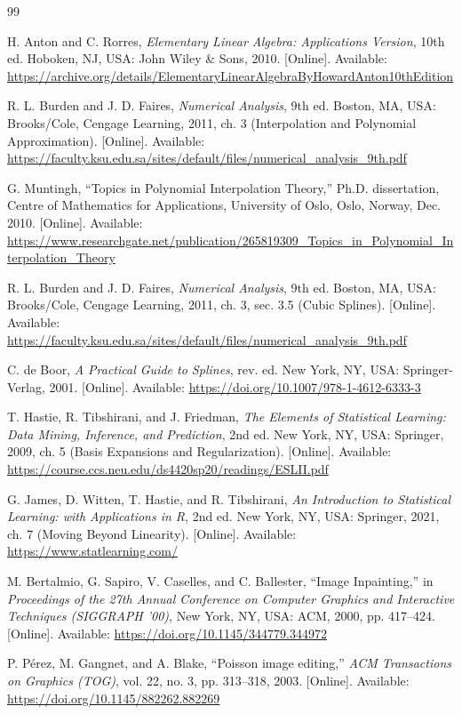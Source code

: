 \documentclass[12pt,a4paper]{report}
\begin{document}
\begin{thebibliography}{99} 
\setlength{\itemsep}{0.5em}

H. Anton and C. Rorres, \textit{Elementary Linear Algebra: Applications Version}, 10th ed. Hoboken, NJ, USA: John Wiley \& Sons, 2010. [Online]. Available: \url{https://archive.org/details/ElementaryLinearAlgebraByHowardAnton10thEdition}

R. L. Burden and J. D. Faires, \textit{Numerical Analysis}, 9th ed. Boston, MA, USA: Brooks/Cole, Cengage Learning, 2011, ch. 3 (Interpolation and Polynomial Approximation). [Online]. Available: \url{https://faculty.ksu.edu.sa/sites/default/files/numerical_analysis_9th.pdf}

G. Muntingh, ``Topics in Polynomial Interpolation Theory,'' Ph.D. dissertation, Centre of Mathematics for Applications, University of Oslo, Oslo, Norway, Dec. 2010. [Online]. Available: \url{https://www.researchgate.net/publication/265819309_Topics_in_Polynomial_Interpolation_Theory}

R. L. Burden and J. D. Faires, \textit{Numerical Analysis}, 9th ed. Boston, MA, USA: Brooks/Cole, Cengage Learning, 2011, ch. 3, sec. 3.5 (Cubic Splines). [Online]. Available: \url{https://faculty.ksu.edu.sa/sites/default/files/numerical_analysis_9th.pdf}

C. de Boor, \textit{A Practical Guide to Splines}, rev. ed. New York, NY, USA: Springer-Verlag, 2001. [Online]. Available: \url{https://doi.org/10.1007/978-1-4612-6333-3}

T. Hastie, R. Tibshirani, and J. Friedman, \textit{The Elements of Statistical Learning: Data Mining, Inference, and Prediction}, 2nd ed. New York, NY, USA: Springer, 2009, ch. 5 (Basis Expansions and Regularization). [Online]. Available: \url{https://course.ccs.neu.edu/ds4420sp20/readings/ESLII.pdf}

G. James, D. Witten, T. Hastie, and R. Tibshirani, \textit{An Introduction to Statistical Learning: with Applications in R}, 2nd ed. New York, NY, USA: Springer, 2021, ch. 7 (Moving Beyond Linearity). [Online]. Available: \url{https://www.statlearning.com/}

M. Bertalmio, G. Sapiro, V. Caselles, and C. Ballester, ``Image Inpainting,'' in \textit{Proceedings of the 27th Annual Conference on Computer Graphics and Interactive Techniques (SIGGRAPH '00)}, New York, NY, USA: ACM, 2000, pp. 417--424. [Online]. Available: \url{https://doi.org/10.1145/344779.344972}

P. Pérez, M. Gangnet, and A. Blake, ``Poisson image editing,'' \textit{ACM Transactions on Graphics (TOG)}, vol. 22, no. 3, pp. 313--318, 2003. [Online]. Available: \url{https://doi.org/10.1145/882262.882269}

\end{thebibliography}
\newpage
\end{document}
